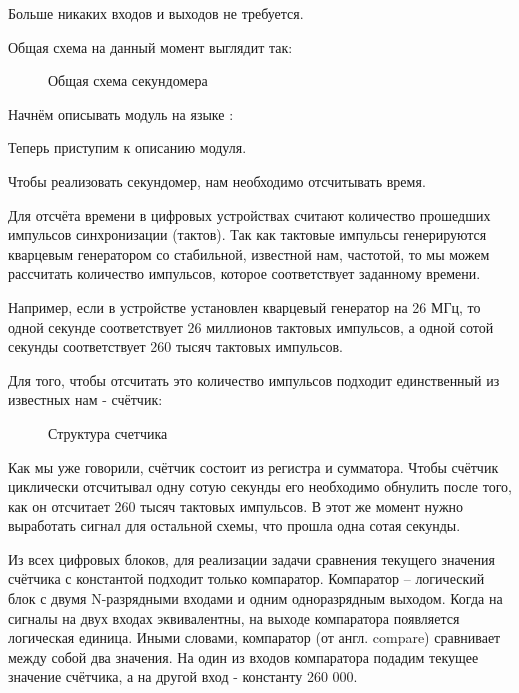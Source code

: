\par{Больше никаких входов и выходов не требуется.}
\par{Общая схема на данный момент выглядит так:}

\begin{figure}[H]
	\centering
	\def\svgwidth{\columnwidth}
	
	\caption{Общая схема секундомера}
\end{figure}

\par{Начнём описывать модуль на языке :}



\par{Теперь приступим к описанию  модуля.}

\par{Чтобы реализовать секундомер, нам необходимо отсчитывать время.}

\par{Для отсчёта времени в цифровых устройствах считают количество прошедших импульсов синхронизации (тактов). Так как тактовые импульсы генерируются кварцевым генератором со стабильной, известной нам, частотой, то мы можем рассчитать количество импульсов, которое соответствует заданному времени.}

\par{Например, если в устройстве установлен кварцевый генератор на 26 МГц, то одной секунде соответствует 26 миллионов тактовых импульсов, а одной сотой секунды соответствует 260 тысяч тактовых импульсов.}

\par{Для того, чтобы отсчитать это количество импульсов подходит единственный из известных нам  - счётчик:}

\begin{figure}[H]
	\centering
	\def\svgwidth{\columnwidth}
	
	\caption{Структура счетчика}
\end{figure}


\par{Как мы уже говорили, счётчик состоит из регистра и сумматора. Чтобы счётчик циклически отсчитывал одну сотую секунды его необходимо обнулить после того, как он отсчитает 260 тысяч тактовых импульсов. В этот же момент нужно выработать сигнал для остальной схемы, что прошла одна сотая секунды.}

\par{Из всех цифровых блоков, для реализации задачи сравнения текущего значения счётчика с константой подходит только компаратор. Компаратор -- логический блок с двумя N-разрядными входами и одним одноразрядным выходом. Когда на сигналы на двух входах эквивалентны, на выходе компаратора появляется логическая единица. Иными словами, компаратор (от англ. compare) сравнивает между собой два значения. На один из входов компаратора подадим текущее значение счётчика, а на другой вход - константу 260 000.}

